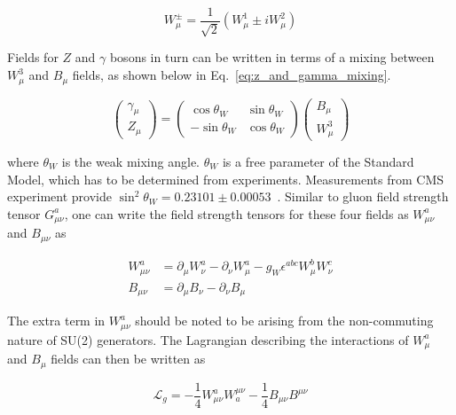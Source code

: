 \begin{equation}
    W^{\pm}_{\mu} = \frac{1}{\sqrt{2}} \left( W^{1}_{\mu} \pm i W^{2}_{\mu} \right)
\end{equation}

Fields for $Z$ and $\gamma$ bosons in turn can be written in terms of a mixing between $W_{\mu}^{3}$ and $B_{\mu}$ fields, 
as shown below in Eq.~\ref{eq:z_and_gamma_mixing}.

\begin{equation}
    \begin{pmatrix}
        \gamma_{\mu} \\ Z_{\mu}
    \end{pmatrix}
    = 
    \begin{pmatrix}
        \cos \theta_{W} & \sin \theta_{W} \\ 
        - \sin \theta_{W} & \cos \theta_{W}
    \end{pmatrix}
    \begin{pmatrix}
        B_{\mu} \\ W^{3}_{\mu}
    \end{pmatrix}
    \label{eq:z_and_gamma_mixing}
\end{equation}

where $\theta_{W}$ is the weak mixing angle. $\theta_{W}$ is a free parameter of the Standard Model, which has to be determined
from experiments. Measurements from CMS experiment provide  
$\sin^2 \theta_{W} = 0.23101 \pm 0.00053$~\cite{CMS:WeakMixingAngleMeasurement}.
Similar to gluon field strength tensor $G_{\mu\nu}^{a}$, one can write the field strength tensors for these four fields 
as $W_{\mu\nu}^{a}$ and $B_{\mu\nu}$ as

\begin{equation}
    \begin{split}
        W_{\mu\nu}^{a} &= \partial_{\mu} W_{\nu}^{a} - \partial_{\nu} W_{\mu}^{a} - g_{W} \epsilon^{abc} W_{\mu}^{b} W_{\nu}^{c} \\
        B_{\mu\nu}     &= \partial_{\mu} B_{\nu}     - \partial_{\nu} B_{\mu}
    \end{split}
    \label{eq:field_strength_ew}
\end{equation}

The extra term in $W_{\mu\nu}^{a}$ should be noted to be arising from the non-commuting nature of SU(2) generators.
The Lagrangian describing the interactions of $W_{\mu}^{a}$ and $B_{\mu}$ fields can then be written as

\begin{equation}
    \mathcal{L}_{g} = -\frac{1}{4} W_{\mu\nu}^{a} W^{\mu\nu}_{a} -\frac{1}{4} B_{\mu\nu} B^{\mu\nu}
    \label{eq:lagrangian_kinetic_term}
\end{equation}

